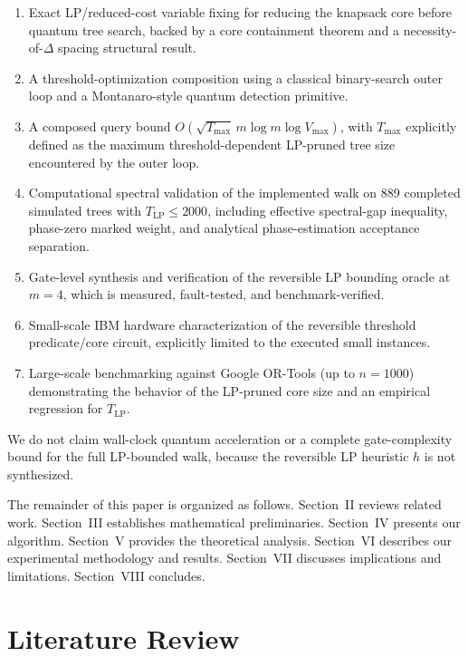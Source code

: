 \documentclass[conference]{IEEEtran} \IEEEoverridecommandlockouts
\begin{document}
\begin{enumerate}
    \item Exact LP/reduced-cost variable fixing for reducing the knapsack core before quantum tree search, backed by a core containment theorem and a necessity-of-$\Delta$ spacing structural result.
    \item A threshold-optimization composition using a classical binary-search outer loop and a Montanaro-style quantum detection primitive.
    \item A composed query bound $O\!\left(\sqrt{T_{\max}}\,m\log m\log V_{\max}\right)$, with $T_{\max}$ explicitly defined as the maximum threshold-dependent LP-pruned tree size encountered by the outer loop.
    \item Computational spectral validation of the implemented walk on 889 completed simulated trees with $T_{\text{LP}} \le 2000$, including effective spectral-gap inequality, phase-zero marked weight, and analytical phase-estimation acceptance separation.
    \item Gate-level synthesis and verification of the reversible LP bounding oracle at $m=4$, which is measured, fault-tested, and benchmark-verified.
    \item Small-scale IBM hardware characterization of the reversible threshold predicate/core circuit, explicitly limited to the executed small instances.
    \item Large-scale benchmarking against Google OR-Tools (up to $n=1000$) demonstrating the behavior of the LP-pruned core size and an empirical regression for $T_{\text{LP}}$.
\end{enumerate}

We do not claim wall-clock quantum acceleration or a complete gate-complexity bound for the full LP-bounded walk, because the reversible LP heuristic $h$ is not synthesized.

The remainder of this paper is organized as follows. Section~II reviews related work. Section~III establishes mathematical preliminaries. Section~IV presents our algorithm. Section~V provides the theoretical analysis. Section~VI describes our experimental methodology and results. Section~VII discusses implications and limitations. Section~VIII concludes.

\section{Literature Review}
\end{document}

